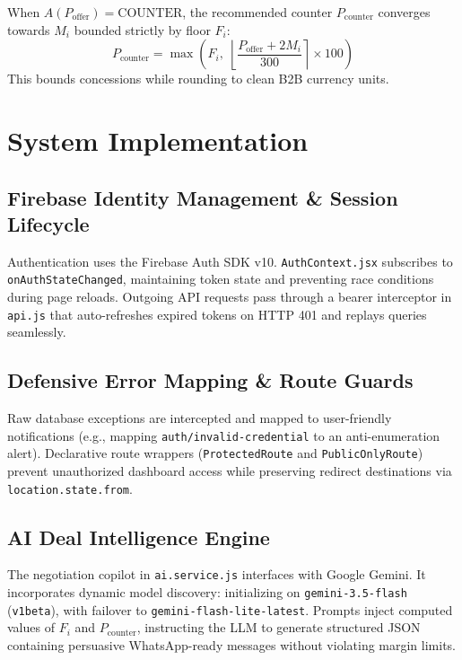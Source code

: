 \documentclass[conference]{IEEEtran}
\begin{document}
When $A(P_{\text{offer}}) = \text{COUNTER}$, the recommended counter $P_{\text{counter}}$ converges towards $M_i$ bounded strictly by floor $F_i$:
\begin{equation}
    P_{\text{counter}} = \max\left(F_i, \; \left\lfloor \frac{P_{\text{offer}} + 2 M_i}{300} \right\rceil \times 100\right)
\end{equation}
This bounds concessions while rounding to clean B2B currency units.

\section{System Implementation}
\label{sec:impl}

\subsection{Firebase Identity Management \& Session Lifecycle}
Authentication uses the Firebase Auth SDK v10. \texttt{AuthContext.jsx} subscribes to \texttt{onAuthStateChanged}, maintaining token state and preventing race conditions during page reloads. Outgoing API requests pass through a bearer interceptor in \texttt{api.js} that auto-refreshes expired tokens on HTTP 401 and replays queries seamlessly.

\subsection{Defensive Error Mapping \& Route Guards}
Raw database exceptions are intercepted and mapped to user-friendly notifications (e.g., mapping \texttt{auth/invalid-credential} to an anti-enumeration alert). Declarative route wrappers (\texttt{ProtectedRoute} and \texttt{PublicOnlyRoute}) prevent unauthorized dashboard access while preserving redirect destinations via \texttt{location.state.from}.

\subsection{AI Deal Intelligence Engine}
The negotiation copilot in \texttt{ai.service.js} interfaces with Google Gemini. It incorporates dynamic model discovery: initializing on \texttt{gemini-3.5-flash} (\texttt{v1beta}), with failover to \texttt{gemini-flash-lite-latest}. Prompts inject computed values of $F_i$ and $P_{\text{counter}}$, instructing the LLM to generate structured JSON containing persuasive WhatsApp-ready messages without violating margin limits.
\end{document}
